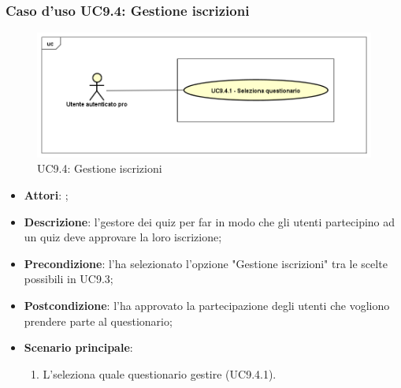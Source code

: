 	 \subsubsection{Caso d'uso UC9.4: Gestione iscrizioni}
	 \label{UC9.4}
	 \begin{figure}[h]
	 	\centering
	 	\includegraphics[scale=0.5,keepaspectratio]{UML/UC9_4.png}
	 	\caption{UC9.4: Gestione iscrizioni}
	 \end{figure}
	 \FloatBarrier
	 \begin{itemize}
	 	\item \textbf{Attori}: \uaupro;
	 	\item \textbf{Descrizione}: l'\uaupro gestore dei quiz per far in modo che gli utenti partecipino ad un quiz deve approvare la loro iscrizione;
	 	\item \textbf{Precondizione}: l'\uaupro ha selezionato l'opzione "Gestione iscrizioni" tra le scelte possibili in UC9.3;
	 	\item \textbf{Postcondizione}: l'\uaupro ha approvato la partecipazione degli utenti che vogliono prendere parte al questionario;
	 	\item \textbf{Scenario principale}: 
	 	\begin{enumerate}
	 		\item L'\uaupro seleziona quale questionario gestire (UC9.4.1).
	 	\end{enumerate}
	 \end{itemize}
	 
